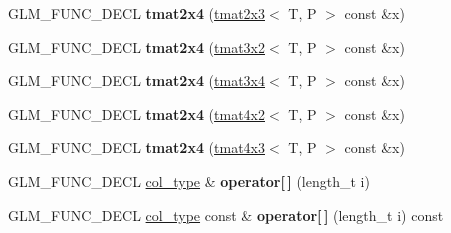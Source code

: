 \begin{DoxyCompactItemize}
\item 
G\+L\+M\+\_\+\+F\+U\+N\+C\+\_\+\+D\+E\+CL {\bfseries tmat2x4} (\hyperlink{structglm_1_1detail_1_1tmat2x3}{tmat2x3}$<$ T, P $>$ const \&x)\hypertarget{structglm_1_1detail_1_1tmat2x4_a03a38c13272b397389f748a852b70bbd}{}\label{structglm_1_1detail_1_1tmat2x4_a03a38c13272b397389f748a852b70bbd}

\item 
G\+L\+M\+\_\+\+F\+U\+N\+C\+\_\+\+D\+E\+CL {\bfseries tmat2x4} (\hyperlink{structglm_1_1detail_1_1tmat3x2}{tmat3x2}$<$ T, P $>$ const \&x)\hypertarget{structglm_1_1detail_1_1tmat2x4_afc4a553b87823b8a974f0f9633fbe21b}{}\label{structglm_1_1detail_1_1tmat2x4_afc4a553b87823b8a974f0f9633fbe21b}

\item 
G\+L\+M\+\_\+\+F\+U\+N\+C\+\_\+\+D\+E\+CL {\bfseries tmat2x4} (\hyperlink{structglm_1_1detail_1_1tmat3x4}{tmat3x4}$<$ T, P $>$ const \&x)\hypertarget{structglm_1_1detail_1_1tmat2x4_a4366b68e3fe9368c0b8815ffd54c2a86}{}\label{structglm_1_1detail_1_1tmat2x4_a4366b68e3fe9368c0b8815ffd54c2a86}

\item 
G\+L\+M\+\_\+\+F\+U\+N\+C\+\_\+\+D\+E\+CL {\bfseries tmat2x4} (\hyperlink{structglm_1_1detail_1_1tmat4x2}{tmat4x2}$<$ T, P $>$ const \&x)\hypertarget{structglm_1_1detail_1_1tmat2x4_a758d4611a4d501821627c8bfbc4e842e}{}\label{structglm_1_1detail_1_1tmat2x4_a758d4611a4d501821627c8bfbc4e842e}

\item 
G\+L\+M\+\_\+\+F\+U\+N\+C\+\_\+\+D\+E\+CL {\bfseries tmat2x4} (\hyperlink{structglm_1_1detail_1_1tmat4x3}{tmat4x3}$<$ T, P $>$ const \&x)\hypertarget{structglm_1_1detail_1_1tmat2x4_a535452a34980c66d927256a8c5244fea}{}\label{structglm_1_1detail_1_1tmat2x4_a535452a34980c66d927256a8c5244fea}

\item 
G\+L\+M\+\_\+\+F\+U\+N\+C\+\_\+\+D\+E\+CL \hyperlink{structglm_1_1detail_1_1tvec4}{col\+\_\+type} \& {\bfseries operator\mbox{[}$\,$\mbox{]}} (length\+\_\+t i)\hypertarget{structglm_1_1detail_1_1tmat2x4_a6227fe9230c96905cd82b40fbbba833b}{}\label{structglm_1_1detail_1_1tmat2x4_a6227fe9230c96905cd82b40fbbba833b}

\item 
G\+L\+M\+\_\+\+F\+U\+N\+C\+\_\+\+D\+E\+CL \hyperlink{structglm_1_1detail_1_1tvec4}{col\+\_\+type} const \& {\bfseries operator\mbox{[}$\,$\mbox{]}} (length\+\_\+t i) const \hypertarget{structglm_1_1detail_1_1tmat2x4_a5b1e3d06ddd4f18288d932a303cecef0}{}\label{structglm_1_1detail_1_1tmat2x4_a5b1e3d06ddd4f18288d932a303cecef0}


\end{DoxyCompactItemize}
